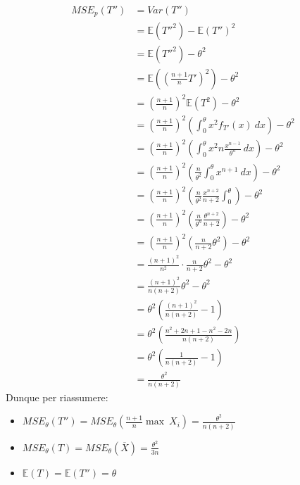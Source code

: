 \documentclass[11pt]{report}
\begin{document}
\begin{equation}
    \begin{split}
        MSE_p(T'') & = Var(T'')\\
        & = \mathbb{E} \left( {T''}^2 \right) - \mathbb{E}(T'')^2\\
        & = \mathbb{E} \left( {T''}^2 \right) - \theta^2\\
        & = \mathbb{E} \left( \left( \frac{n+1}{n} T' \right)^2 \right) - \theta^2\\
        & = \left( \frac{n+1}{n} \right)^2 \mathbb{E}(T^2) - \theta^2\\
        & = \left( \frac{n+1}{n} \right)^2 \left( \int_0^\theta x^2 f_{T'}(x)\ dx \right) - \theta^2\\
        & = \left( \frac{n+1}{n} \right)^2 \left( \int_0^\theta x^2 n\frac{x^{n-1}}{\theta^n}\ dx \right) - \theta^2\\
        & = \left( \frac{n+1}{n} \right)^2 \left( \frac{n}{\theta^2} \int_0^\theta x^{n+1}\ dx \right) - \theta^2\\
        & = \left( \frac{n+1}{n} \right)^2 \left( \frac{n}{\theta^2} \frac{x^{n+2}}{n+2} \int_0^\theta \right) - \theta^2\\
        & = \left( \frac{n+1}{n} \right)^2 \left( \frac{n}{\theta^n} \frac{\theta^{n+2}}{n+2} \right) - \theta^2\\
        & = \left( \frac{n+1}{n} \right)^2 \left( \frac{n}{n+2}\theta^2 \right) - \theta^2\\
        & = \frac{(n+1)^2}{n^2} \cdot \frac{n}{n+2}\theta^2 - \theta^2\\
        & = \frac{(n+1)^2}{n(n+2)}\theta^2 - \theta^2\\
        & = \theta^2 \left( \frac{(n+1)^2}{n(n+2)} - 1 \right)\\
        & = \theta^2 \left( \frac{n^2 + 2n + 1 - n^2 - 2n}{n(n+2)} \right)\\
        & = \theta^2 \left( \frac{1}{n(n+2)} - 1 \right)\\
        & = \frac{\theta^2}{n(n+2)}
    \end{split}
\end{equation}
Dunque per riassumere:
\begin{itemize}
    \item $MSE_\theta(T'') = MSE_\theta \left( \frac{n+1}{n} \max\ X_i \right) = \frac{\theta^2}{n(n+2)}$
    \item $MSE_\theta(T) = MSE_\theta(\overline{X}) = \frac{\theta^2}{3n}$
    \item $\mathbb{E}(T) = \mathbb{E}(T'') = \theta$
\end{itemize}
\end{document}
